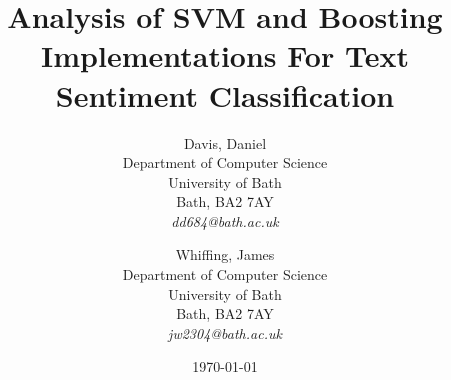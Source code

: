 
\thispagestyle{empty} %

\newpage

\title{Analysis of SVM and Boosting Implementations For Text Sentiment Classification}
\renewcommand\maketitlehookb{\centering \Large CM50265 - Coursework 2 - Group 4}
\date{\today}
\author{
    Davis, Daniel\\
    Department of Computer Science\\
    University of Bath\\
    Bath, BA2 7AY \\
    \textit{dd684@bath.ac.uk} \\
    \and
    Whiffing, James\\
    Department of Computer Science\\
    University of Bath\\
    Bath, BA2 7AY \\
    \textit{jw2304@bath.ac.uk} \\
}

\maketitle

\clearpage
\restoregeometry
\newpage

\setcounter{page}{0}
\pagestyle{fancy}


\tableofcontents
\clearpage
\newpage
{}
\listoffigures
\clearpage
\newpage
{}
\listoftables
\clearpage
\newpage


\setcounter{page}{1}
